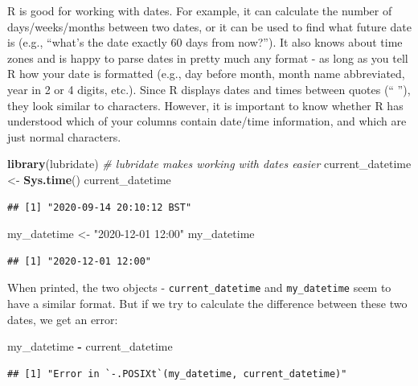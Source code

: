\documentclass[
  12pt,
  krantz2]{krantz}
\makeatletter
\newenvironment{Shaded}{\begin{snugshade}}{\end{snugshade}}
\newcommand{\CommentTok}[1]{\textcolor[rgb]{0.56,0.35,0.01}{\textit{#1}}}
\newcommand{\KeywordTok}[1]{\textcolor[rgb]{0.13,0.29,0.53}{\textbf{#1}}}
\newcommand{\NormalTok}[1]{#1}
\newcommand{\OperatorTok}[1]{\textcolor[rgb]{0.81,0.36,0.00}{\textbf{#1}}}
\newcommand{\StringTok}[1]{\textcolor[rgb]{0.31,0.60,0.02}{#1}}
\newenvironment{kframe}{%
\medskip{}
\setlength{\fboxsep}{.8em}
 \def\at@end@of@kframe{}%
 \ifinner\ifhmode%
  \def\at@end@of@kframe{\end{minipage}}%
  \begin{minipage}{\columnwidth}%
 \fi\fi%
 \def\FrameCommand##1{\hskip\@totalleftmargin \hskip-\fboxsep
 \colorbox{shadecolor}{##1}\hskip-\fboxsep
     \hskip-\linewidth \hskip-\@totalleftmargin \hskip\columnwidth}%
 \MakeFramed {\advance\hsize-\width
   \@totalleftmargin\z@ \linewidth\hsize
   \@setminipage}}%
 {\par\unskip\endMakeFramed%
 \at@end@of@kframe}
\renewenvironment{Shaded}{\begin{kframe}}{\end{kframe}}
\makeatother
\begin{document}
R is good for working with dates.
For example, it can calculate the number of days/weeks/months between two dates, or it can be used to find what future date is (e.g., ``what's the date exactly 60 days from now?'').
It also knows about time zones and is happy to parse dates in pretty much any format - as long as you tell R how your date is formatted (e.g., day before month, month name abbreviated, year in 2 or 4 digits, etc.).
Since R displays dates and times between quotes (`` ''), they look similar to characters.
However, it is important to know whether R has understood which of your columns contain date/time information, and which are just normal characters.

\begin{Shaded}
\begin{Highlighting}[]
\KeywordTok{library}\NormalTok{(lubridate) }\CommentTok{# lubridate makes working with dates easier}
\NormalTok{current_datetime <-}\StringTok{ }\KeywordTok{Sys.time}\NormalTok{()}
\NormalTok{current_datetime}
\end{Highlighting}
\end{Shaded}

\begin{verbatim}
## [1] "2020-09-14 20:10:12 BST"
\end{verbatim}

\begin{Shaded}
\begin{Highlighting}[]
\NormalTok{my_datetime <-}\StringTok{ "2020-12-01 12:00"}
\NormalTok{my_datetime}
\end{Highlighting}
\end{Shaded}

\begin{verbatim}
## [1] "2020-12-01 12:00"
\end{verbatim}

When printed, the two objects - \texttt{current\_datetime} and \texttt{my\_datetime} seem to have a similar format.
But if we try to calculate the difference between these two dates, we get an error:

\begin{Shaded}
\begin{Highlighting}[]
\NormalTok{my_datetime }\OperatorTok{-}\StringTok{ }\NormalTok{current_datetime}
\end{Highlighting}
\end{Shaded}

\begin{verbatim}
## [1] "Error in `-.POSIXt`(my_datetime, current_datetime)"
\end{verbatim}
\end{document}
